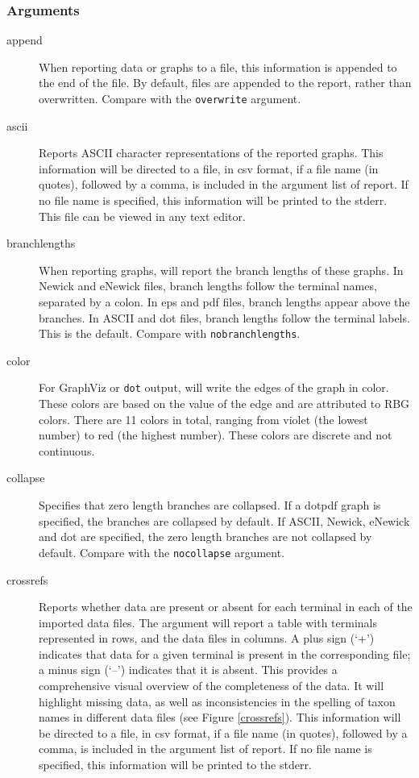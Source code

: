 	\subsubsection{Arguments}
	\begin{description}
		
		\item[append] When reporting data or graphs to a file, this information is 
		appended to the end of the file. By default, files are appended to the report, 
		rather than overwritten. Compare with the \texttt{overwrite} argument.

		\item[ascii] Reports ASCII character representations of the reported graphs.
		This information will be directed to a file, in csv format, if a file name (in quotes), 
		followed by a comma, is included in the argument list of report. If no file name is 
		specified, this information will be printed to the stderr. This file can be viewed 
		in any text editor. 
		
		\item[branchlengths] When reporting graphs, \phyg will report the branch 
		lengths of these graphs. In Newick and eNewick files, branch lengths 
		follow the terminal names, separated by a colon. In eps and pdf files, 
		branch lengths appear above the branches. In ASCII and dot files, branch 
		lengths follow the terminal labels. This is the default. Compare with 
		\texttt{nobranchlengths}. 
		
		\item[color] For GraphViz or \texttt{dot} output, \phyg will write the edges of 
		the graph in color. These colors are based on the value of the edge and are
		attributed to RBG colors. There are 11 colors in total, ranging from violet (the 
		lowest number) to red (the highest number). These colors are discrete and not 
		continuous.

		\item[collapse] Specifies that zero length branches are collapsed. If a dotpdf 
		graph is specified, the branches are collapsed by default. If ASCII, Newick, 
		eNewick and dot are specified, the zero length branches are not collapsed by 
		default. Compare with the \texttt{nocollapse} argument.  		
		
		\item[crossrefs] Reports whether data are present or absent for each terminal 
		in each of the imported data files. The argument will report a table with terminals 
		represented in rows, and the data files in columns. A plus sign (`+') indicates that 
		data for a given terminal is present in the corresponding file; a minus sign (`--') 
		indicates that it is absent. This provides a comprehensive visual overview of the 
		completeness of the data. It will highlight missing data, as well as inconsistencies 
		in the spelling of taxon names in different data files (see Figure \ref{crossrefs}).  
		This information will be directed to a file, in csv format, if a file name (in quotes), 
		followed by a comma, is included in the argument list of report. If no file name is 
		specified, this information will be printed to the stderr.
		

\end{description}
